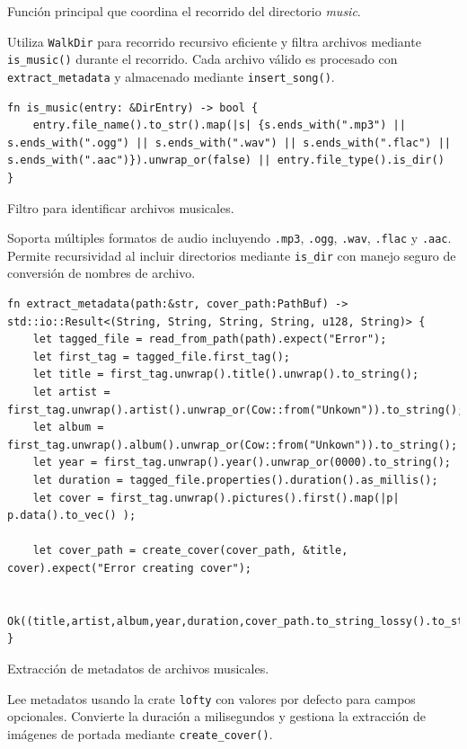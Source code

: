 \documentclass[11pt, a4paper]{article}
\begin{document}
            Función principal que coordina el recorrido del directorio \textit{music}.

            Utiliza \verb|WalkDir| para recorrido recursivo eficiente y filtra archivos mediante \verb|is_music()| durante el recorrido. Cada archivo válido es procesado con \verb|extract_metadata| y almacenado mediante \verb|insert_song()|.

            \begin{lstlisting}[caption={fn is\_music()}]
fn is_music(entry: &DirEntry) -> bool {
    entry.file_name().to_str().map(|s| {s.ends_with(".mp3") || s.ends_with(".ogg") || s.ends_with(".wav") || s.ends_with(".flac") || s.ends_with(".aac")}).unwrap_or(false) || entry.file_type().is_dir()
}
            \end{lstlisting}

            Filtro para identificar archivos musicales.

            Soporta múltiples formatos de audio incluyendo \verb|.mp3|, \verb|.ogg|, \verb|.wav|, \verb|.flac| y \verb|.aac|. Permite recursividad al incluir directorios mediante \verb|is_dir| con manejo seguro de conversión de nombres de archivo.

            \begin{lstlisting}[caption={fn extract\_metadata()}]
fn extract_metadata(path:&str, cover_path:PathBuf) -> std::io::Result<(String, String, String, String, u128, String)> {
    let tagged_file = read_from_path(path).expect("Error");
    let first_tag = tagged_file.first_tag();
    let title = first_tag.unwrap().title().unwrap().to_string();
    let artist = first_tag.unwrap().artist().unwrap_or(Cow::from("Unkown")).to_string();
    let album = first_tag.unwrap().album().unwrap_or(Cow::from("Unkown")).to_string();
    let year = first_tag.unwrap().year().unwrap_or(0000).to_string();
    let duration = tagged_file.properties().duration().as_millis();
    let cover = first_tag.unwrap().pictures().first().map(|p| p.data().to_vec() );

    let cover_path = create_cover(cover_path, &title, cover).expect("Error creating cover");

    Ok((title,artist,album,year,duration,cover_path.to_string_lossy().to_string()))
}
            \end{lstlisting}

            Extracción de metadatos de archivos musicales.

            Lee metadatos usando la crate \verb|lofty| con valores por defecto para campos opcionales. Convierte la duración a milisegundos y gestiona la extracción de imágenes de portada mediante \verb|create_cover()|.
\end{document}
